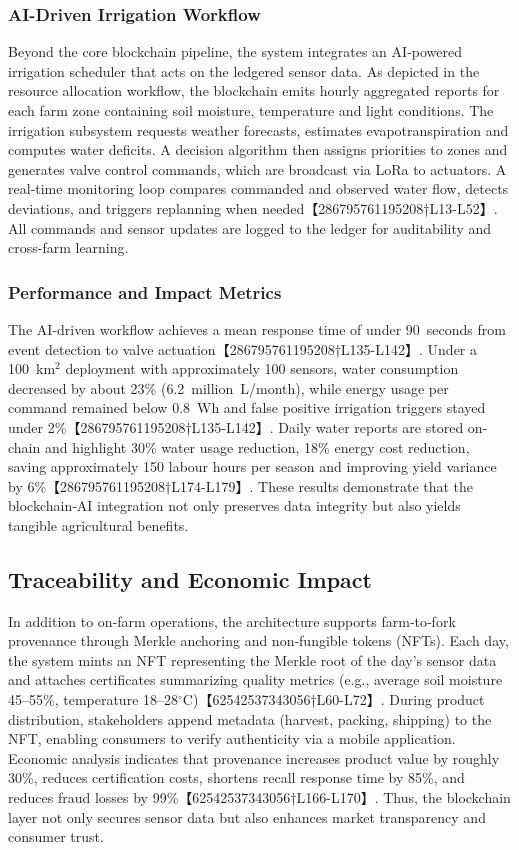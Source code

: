 \subsubsection{AI-Driven Irrigation Workflow}
Beyond the core blockchain pipeline, the system integrates an AI‑powered irrigation scheduler that acts on the ledgered sensor data.  As depicted in the resource allocation workflow, the blockchain emits hourly aggregated reports for each farm zone containing soil moisture, temperature and light conditions.  The irrigation subsystem requests weather forecasts, estimates evapotranspiration and computes water deficits.  A decision algorithm then assigns priorities to zones and generates valve control commands, which are broadcast via LoRa to actuators.  A real‑time monitoring loop compares commanded and observed water flow, detects deviations, and triggers replanning when needed【286795761195208†L13-L52】.  All commands and sensor updates are logged to the ledger for auditability and cross-farm learning.

\subsubsection{Performance and Impact Metrics}
The AI‑driven workflow achieves a mean response time of under 90~seconds from event detection to valve actuation【286795761195208†L135-L142】.  Under a 100~km$^2$ deployment with approximately 100 sensors, water consumption decreased by about 23\% (6.2~million~L/month), while energy usage per command remained below 0.8~Wh and false positive irrigation triggers stayed under 2\%【286795761195208†L135-L142】.  Daily water reports are stored on-chain and highlight 30\% water usage reduction, 18\% energy cost reduction, saving approximately 150 labour hours per season and improving yield variance by 6\%【286795761195208†L174-L179】.  These results demonstrate that the blockchain‑AI integration not only preserves data integrity but also yields tangible agricultural benefits.

\subsection{Traceability and Economic Impact}
In addition to on-farm operations, the architecture supports farm‑to‑fork provenance through Merkle anchoring and non‑fungible tokens (NFTs).  Each day, the system mints an NFT representing the Merkle root of the day's sensor data and attaches certificates summarizing quality metrics (e.g., average soil moisture 45--55\%, temperature 18--28$^\circ$C)【62542537343056†L60-L72】.  During product distribution, stakeholders append metadata (harvest, packing, shipping) to the NFT, enabling consumers to verify authenticity via a mobile application.  Economic analysis indicates that provenance increases product value by roughly 30\%, reduces certification costs, shortens recall response time by 85\%, and reduces fraud losses by 99\%【62542537343056†L166-L170】.  Thus, the blockchain layer not only secures sensor data but also enhances market transparency and consumer trust.

